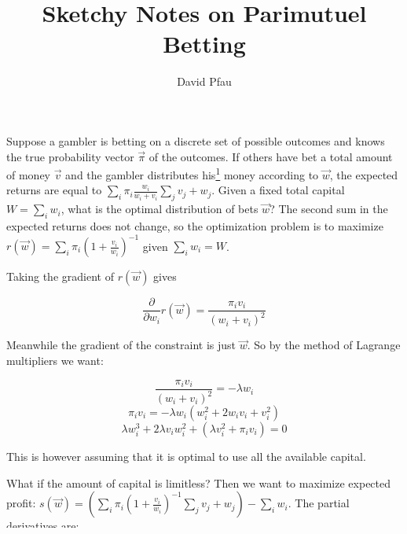 \documentclass[11pt]{article}
\title{Sketchy Notes on Parimutuel Betting}
\author{David Pfau}
\begin{document}
\maketitle

Suppose a gambler is betting on a discrete set of possible outcomes and knows the true probability vector $\vec{\pi}$ of the outcomes.  If others have bet a total amount of money $\vec{v}$ and the gambler distributes his\footnote{Totally gender normative and not ashamed.  How many women do you see at horse races?} money according to $\vec{w}$, the expected returns are equal to $\sum_i \pi_i \frac{w_i}{w_i + v_i} \sum_{j} v_j + w_j$.  Given a fixed total capital $W = \sum_i w_i$, what is the optimal distribution of bets $\vec{w}$?  The second sum in the expected returns does not change, so the optimization problem is to maximize $r(\vec{w}) =\sum_i \pi_i \left(1 + \frac{v_i}{w_i}\right)^{-1}$ given $\sum_i w_i = W$.

Taking the gradient of $r(\vec{w})$ gives

\[ \frac{\partial}{\partial w_i} r(\vec{w}) = \frac{\pi_i v_i}{(w_i + v_i)^2}\]

Meanwhile the gradient of the constraint is just $\vec{w}$.  So by the method of Lagrange multipliers we want:

\[ \frac{\pi_i v_i}{(w_i + v_i)^2} = -\lambda w_i \]
\[ \pi_i v_i = -\lambda w_i (w_i^2 + 2w_i v_i + v_i^2) \]
\[ \lambda w_i^3 + 2\lambda v_i w_i^2 + (\lambda v_i^2 + \pi_i v_i) = 0\]

This is however assuming that it is optimal to use all the available capital.

What if the amount of capital is limitless?  Then we want to maximize expected profit: $s(\vec{w}) = \left(\sum_i \pi_i \left(1 + \frac{v_i}{w_i}\right)^{-1}\sum_j v_j + w_j \right) - \sum_i w_i$.  The partial derivatives are:

\[ \frac{\partial}{\partial w_i} s(\vec{w}) = \frac{\pi_i v_i}{(w_i + v_i)^2} \sum_j (v_j + w_j) + \sum_j\pi_j \left(1 + \frac{v_j}{w_j}\right)^{-1} - 1 \]

Say $\vec{v} + \vec{w} = k\vec{\pi}$, then the above simplifies to

\[ -\frac{w_i}{k\pi_i} + \sum_j \frac{w_j}{k} \]
\end{document}
